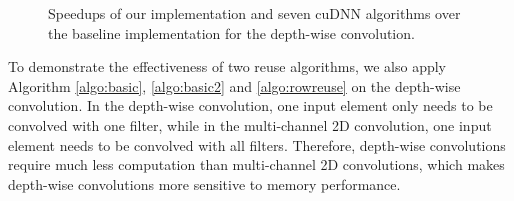 \begin{figure}
\centering
	

\caption{Speedups of our implementation and seven cuDNN algorithms over the baseline implementation for the depth-wise convolution.}
\label{fig:3druntime}
\end{figure}


To demonstrate the effectiveness of two reuse algorithms, we also apply Algorithm \ref{algo:basic}, \ref{algo:basic2} and \ref{algo:rowreuse} on the depth-wise convolution. In the depth-wise convolution, one input element only needs to be convolved with one filter, while in the multi-channel 2D convolution, one input element needs to be convolved with all filters. Therefore, depth-wise convolutions require much less computation than multi-channel 2D convolutions, which makes depth-wise convolutions more sensitive to memory performance. 
 
